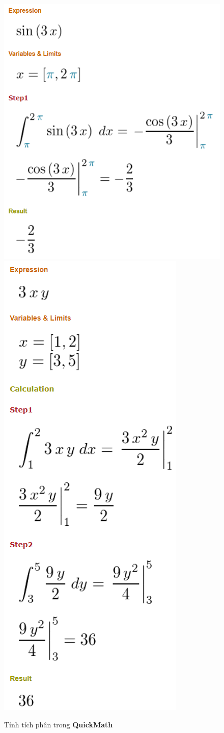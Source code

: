 \documentclass{article}
\begin{document}
\begin{enumerate}
\begin{itemize}
\begin{figure}
	\centering
	\includegraphics[width=0.5\linewidth]{quickmath6}
	\includegraphics[width=0.5\linewidth]{quickmath7}
	\caption{Tính tích phân trong \textbf{QuickMath}}
	\label{fig:quickmath6}
\end{figure}
\end{itemize}

\end{enumerate}	
\end{document}
